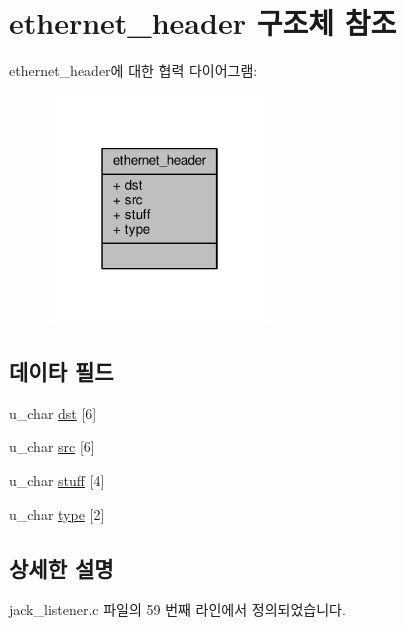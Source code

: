 \hypertarget{structethernet__header}{}\section{ethernet\+\_\+header 구조체 참조}
\label{structethernet__header}


ethernet\+\_\+header에 대한 협력 다이어그램\+:
\nopagebreak
\begin{figure}[H]
\begin{center}
\leavevmode
\includegraphics[width=166pt]{structethernet__header__coll__graph}
\end{center}
\end{figure}
\subsection*{데이타 필드}
\begin{DoxyCompactItemize}
\item 
u\+\_\+char \hyperlink{structethernet__header_a3bb79d2629c3aa74f5a8a058fce78c7a}{dst} \mbox{[}6\mbox{]}
\item 
u\+\_\+char \hyperlink{structethernet__header_a958aa83d56946de5a5b50cdbc17e055c}{src} \mbox{[}6\mbox{]}
\item 
u\+\_\+char \hyperlink{structethernet__header_a833470224ab86d3dc30e51fdf787e958}{stuff} \mbox{[}4\mbox{]}
\item 
u\+\_\+char \hyperlink{structethernet__header_a5cfaf0a7a234e912fb06a8b7d1681b65}{type} \mbox{[}2\mbox{]}
\end{DoxyCompactItemize}


\subsection{상세한 설명}


jack\+\_\+listener.\+c 파일의 59 번째 라인에서 정의되었습니다.




